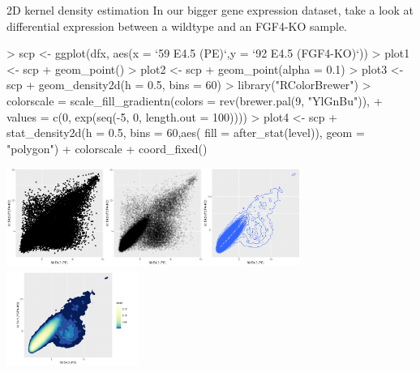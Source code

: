 \documentclass[11pt,handout,aspectratio=169]{beamer}
\begin{document}
\begin{frame}[fragile]{2D kernel density estimation}
In our bigger gene expression dataset, take a look at differential expression between a wildtype and an FGF4-KO sample.

\tiny
\begin{Schunk}
\begin{Sinput}
> scp <- ggplot(dfx, aes(x = `59 E4.5 (PE)`,y = `92 E4.5 (FGF4-KO)`))
> plot1 <- scp + geom_point()
> plot2 <- scp + geom_point(alpha = 0.1)
> plot3 <- scp + geom_density2d(h = 0.5, bins = 60)
> library("RColorBrewer")
> colorscale = scale_fill_gradientn(colors = rev(brewer.pal(9, "YlGnBu")), 
+ 	values = c(0, exp(seq(-5, 0, length.out = 100))))
> plot4 <- scp + stat_density2d(h = 0.5, bins = 60,aes( fill = after_stat(level)), geom = "polygon") +  colorscale + coord_fixed()
\end{Sinput}
\end{Schunk}
\begin{center}
\includegraphics[height=3.2cm,width=3.2cm]{pics/plot1.5a.pdf}\includegraphics[height=3.2cm,width=3.2cm]{pics/plot1.5b.pdf}\includegraphics[height=3.2cm,width=3.2cm]{pics/plot1.5c.pdf}	\includegraphics[height=3.2cm,width=4.3cm]{pics/plot1.5d.pdf}			
\end{center}
\end{frame}
\end{document}
